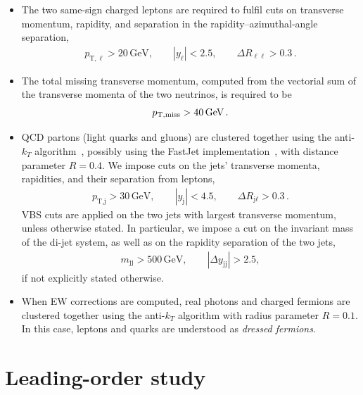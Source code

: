 \documentclass[twocolumn,epjc3]{svjour3} %
\newcommand{\Pl}{\ell}
\newcommand{\Pj}{\ensuremath{\text{j}}\xspace}
\newcommand{\GeV}{\ensuremath{\,\text{GeV}}\xspace}
\newcommand{\ptsub}[1]{\ensuremath{p_{\text{T},#1}}\xspace}
\begin{document}
    \begin{itemize}
        \item The two same-sign charged leptons are required to fulfil cuts on transverse momentum, rapidity, and separation in the rapidity--azimuthal-angle separation, 
            \begin{align}
            \label{cut:1}
             \ptsub{\Pl} >  20\GeV,\qquad |y_{\Pl}| < 2.5, \qquad \Delta R_{\Pl\Pl}> 0.3\,.
            \end{align}
        \item The total missing transverse momentum, computed from the vectorial sum of the transverse momenta of the two neutrinos, is required to be
            \begin{align}
            \label{cut:2}
              p_{\rm T, miss} >  40\GeV\,.
            \end{align}
        \item QCD partons (light quarks and gluons) are clustered together using the anti-$k_T$ algorithm~\cite{Cacciari:2008gp}, possibly using the {\sc FastJet} implementation~\cite{Cacciari:2011ma}, with distance parameter $R=0.4$.
        We impose cuts on the jets' transverse momenta, rapidities, and their separation from leptons,  
            \begin{align}
            \label{cut:3}
             \ptsub{\Pj} >  30\GeV, \qquad |y_\Pj| < 4.5, \qquad \Delta R_{\Pj\Pl} > 0.3 \,.
            \end{align}
            VBS cuts are applied on the two jets with largest transverse momentum, unless otherwise stated. In particular, we impose a cut on the 
             in\-vari\-ant mass of the di-jet system, as well as on the rapidity separation of the two jets,          
            \begin{align}
            \label{cut:4}
             m_{\Pj \Pj} >  500\GeV,\qquad |\Delta y_{\Pj \Pj}| > 2.5, 
            \end{align}
            if not explicitly stated otherwise. 
        \item When EW corrections are computed, real photons and charged fermions are clustered together using the anti-$k_T$ algorithm with
            radius parameter $R=0.1$. In this case, leptons and quarks are understood as {\it dressed fermions}.
    \end{itemize}

\section{Leading-order study}
    \label{sec:LO}
\end{document}
